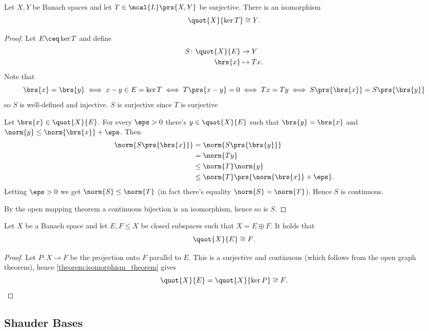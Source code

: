 \documentclass[10pt, twoside]{book}
\begin{document}
\begin{theorem}\label{theorem:isomorphism_theorem}
Let $X,Y$ be Banach spaces and let $T \in \mcal{L}\prs{X,Y}$ be surjective. There is an isomorphism
\[\quot{X}{\ker T} \cong Y \text{.}\]
\end{theorem}

\begin{proof}
Let $E \ceq \ker T$ and define
\begin{align*}
S \colon \quot{X}{E} &\to Y \\
\brs{x} &\mapsto Tx \text{.}
\end{align*}
Note that
\[\brs{x} = \brs{y} \iff x-y \in E = \ker T \iff T\prs{x-y} = 0 \iff Tx = Ty \iff S\prs{\brs{x}} = S\prs{\brs{y}}\]
so $S$ is well-defined and injective.
$S$ is surjective since $T$ is surjective

Let $\brs{x} \in \quot{X}{E}$. For every $\eps > 0$ there's $y \in \quot{X}{E}$ such that $\brs{y} =\brs{x}$ and $\norm{y} \leq \norm{\brs{x}} + \eps$.
Then
\begin{align*}
\norm{S\prs{\brs{x}}} &= \norm{S\prs{\brs{y}}}
\\&= \norm{Ty}
\\&\leq \norm{T}\norm{y}
\\&\leq \norm{T} \prs{\norm{\brs{x}}+\eps} \text{.}
\end{align*}
Letting $\eps > 0$ we get $\norm{S} \leq \norm{T}$ (in fact there's equality $\norm{S} = \norm{T}$).
Hence $S$ is continuous.

By the open mapping theorem a continuous bijection is an isomorphism, hence so is $S$.
\end{proof}

\begin{corollary}
Let $X$ be a Banach space and let $E,F \leq X$ be closed subspaces such that $X = E \oplus F$. It holds that
\[\quot{X}{E} \cong F \text{.}\]
\end{corollary}

\begin{proof}
Let $P \colon X \to F$ be the projection onto $F$ parallel to $E$. This is a surjective and continuous (which follows from the open graph theorem), hence \ref{theorem:isomorphism_theorem} gives
\[\quot{X}{E} = \quot{X}{\ker P} \cong F \text{.}\]
\end{proof}

\subsection{Shauder Bases}
\end{document}
